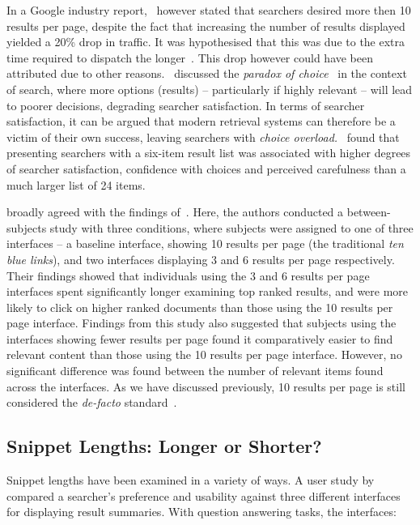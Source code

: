 In a Google industry report,~\cite{linden2006} however stated that searchers desired more then 10 results per page, despite the fact that increasing the number of results displayed yielded a 20\% drop in traffic. It was hypothesised that this was due to the extra time required to dispatch the longer~. This drop however could have been attributed due to other reasons.~\cite{oulasvirta2009serp_size} discussed the \emph{paradox of choice}~\citep{schwartz2005paradox_of_choice} in the context of search, where more options (results) -- particularly if highly relevant -- will lead to poorer decisions, degrading searcher satisfaction. In terms of searcher satisfaction, it can be argued that modern retrieval systems can therefore be a victim of their own success, leaving searchers with \emph{choice overload.}~\cite{oulasvirta2009serp_size} found that presenting searchers with a six-item result list was associated with higher degrees of searcher satisfaction, confidence with choices and perceived carefulness than a much larger list of 24 items.

\cite{kelly2015serp_size} broadly agreed with the findings of~\cite{oulasvirta2009serp_size}. Here, the authors conducted a between-subjects study with three conditions, where subjects were assigned to one of three interfaces -- a baseline interface, showing 10 results per page (the traditional \emph{ten blue links}), and two interfaces displaying 3 and 6 results per page respectively. Their findings showed that individuals using the 3 and 6 results per page interfaces spent significantly longer examining top ranked results, and were more likely to click on higher ranked documents than those using the 10 results per page interface. Findings from this study also suggested that subjects using the interfaces showing fewer results per page found it comparatively easier to find relevant content than those using the 10 results per page interface. However, no significant difference was found between the number of relevant items found across the interfaces. As we have discussed previously, 10 results per page is still considered the \emph{de-facto} standard~\citep{hearst2009_search}.

\subsection{Snippet Lengths: Longer or Shorter?}
Snippet lengths have been examined in a variety of ways. A user study by~\cite{paek2004wavelens} compared a searcher's preference and usability against three different interfaces for displaying result summaries. With question answering tasks, the interfaces:

